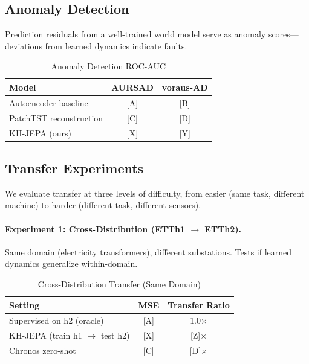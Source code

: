\documentclass{article}
\begin{document}
\subsection{Anomaly Detection}

Prediction residuals from a well-trained world model serve as anomaly scores—deviations from learned dynamics indicate faults.

\begin{table}[h]
\centering
\caption{Anomaly Detection ROC-AUC}
\small
\begin{tabular}{@{}lcc@{}}
\toprule
\textbf{Model} & \textbf{AURSAD} & \textbf{voraus-AD} \\
\midrule
Autoencoder baseline & [A] & [B] \\
PatchTST reconstruction & [C] & [D] \\
KH-JEPA (ours) & [X] & [Y] \\
\bottomrule
\end{tabular}
\end{table}

\subsection{Transfer Experiments}

We evaluate transfer at three levels of difficulty, from easier (same task, different machine) to harder (different task, different sensors).

\paragraph{Experiment 1: Cross-Distribution (ETTh1 $\rightarrow$ ETTh2).}
Same domain (electricity transformers), different substations. Tests if learned dynamics generalize within-domain.

\begin{table}[h]
\centering
\caption{Cross-Distribution Transfer (Same Domain)}
\small
\begin{tabular}{@{}lcc@{}}
\toprule
\textbf{Setting} & \textbf{MSE} & \textbf{Transfer Ratio} \\
\midrule
Supervised on h2 (oracle) & [A] & 1.0$\times$ \\
KH-JEPA (train h1 $\rightarrow$ test h2) & [X] & [Z]$\times$ \\
Chronos zero-shot & [C] & [D]$\times$ \\
\bottomrule
\end{tabular}
\end{table}
\end{document}
